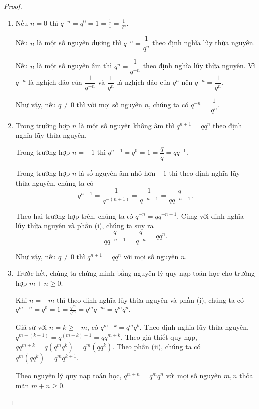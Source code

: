\begin{proof}
    \begin{enumerate}[label={(\roman*)}]
        \item Nếu $n = 0$ thì $q^{-n} = q^{0} = 1 = \frac{1}{1} = \frac{1}{q^{n}}$.

              Nếu $n$ là một số nguyên dương thì $q^{-n} = \dfrac{1}{q^{n}}$ theo định nghĩa lũy thừa nguyên.

              Nếu $n$ là một số nguyên âm thì $q^{n} = \dfrac{1}{q^{-n}}$ theo định nghĩa lũy thừa nguyên. Vì $q^{-n}$ là nghịch đảo của $\dfrac{1}{q^{-n}}$ và $\dfrac{1}{q^{n}}$ là nghịch đảo của $q^{n}$ nên $q^{-n} = \dfrac{1}{q^{n}}$.

              Như vậy, nếu $q\ne 0$ thì với mọi số nguyên $n$, chúng ta có $q^{-n} = \dfrac{1}{q^{n}}$.
        \item Trong trường hợp $n$ là một số nguyên không âm thì $q^{n+1} = qq^{n}$ theo định nghĩa lũy thừa nguyên.

              Trong trường hợp $n = -1$ thì $q^{n+1} = q^{0} = 1 = \dfrac{q}{q} = qq^{-1}$.

              Trong trường hợp $n$ là số nguyên âm nhỏ hơn $-1$ thì theo định nghĩa lũy thừa nguyên, chúng ta có
              \[
                  q^{n+1} = \dfrac{1}{q^{-(n+1)}} = \dfrac{1}{q^{-n-1}} = \dfrac{q}{qq^{-n-1}}.
              \]

              Theo hai trường hợp trên, chúng ta có $q^{-n} = qq^{-n-1}$. Cùng với định nghĩa lũy thừa nguyên và phần (i), chúng ta suy ra
              \[
                  \dfrac{q}{qq^{-n-1}} = \dfrac{q}{q^{-n}} = qq^{n}.
              \]

              Như vậy, nếu $q\ne 0$ thì $q^{n+1} = qq^{n}$ với mọi số nguyên $n$.
        \item Trước hết, chúng ta chứng minh bằng nguyên lý quy nạp toán học cho trường hợp $m + n\geq 0$.

              Khi $n = -m$ thì theo định nghĩa lũy thừa nguyên và phần (i), chúng ta có $q^{m + n} = q^{0} = 1 = \frac{q^{m}}{q^{m}} = q^{m}q^{-m} = q^{m}q^{n}$.

              Giả sử với $n = k\geq -m$, có $q^{m+k} = q^{m}q^{k}$. Theo định nghĩa lũy thừa nguyên, $q^{m+(k+1)} = q^{(m+k)+1} = qq^{m+k}$. Theo giả thiết quy nạp, $qq^{m+k} = q(q^{m}q^{k}) = q^{m}(qq^{k})$. Theo phần (ii), chúng ta có $q^{m}(qq^{k}) = q^{m}q^{k+1}$.

              Theo nguyên lý quy nạp toán học, $q^{m + n} = q^{m}q^{n}$ với mọi số nguyên $m, n$ thỏa mãn $m+n\geq 0$.


\end{enumerate}
\end{proof}
